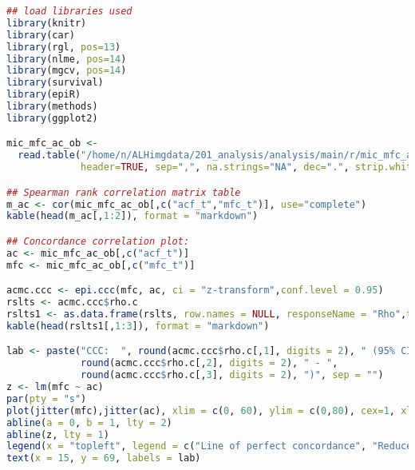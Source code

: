 \begin{lstlisting}[language=R, caption=Automatic and manual concordance correlation., label=cd:acmc-concord]
## load libraries used
library(knitr)
library(car)
library(rgl, pos=13)
library(nlme, pos=14)
library(mgcv, pos=14)
library(survival)
library(epiR)
library(methods)
library(ggplot2)

mic_mfc_ac_ob <- 
  read.table("/home/n/ALHimgdata/201_analysis/analysis/main/r/mic_mfc_ac_ob/csv/mic_mfc_ac_ob_4R.csv", 
             header=TRUE, sep=",", na.strings="NA", dec=".", strip.white=TRUE)

## Spearman rank correlation matrix table
m_ac <- cor(mic_mfc_ac_ob[,c("acf_t","mfc_t")], use="complete")
kable(head(m_ac[,1:2]), format = "markdown")

## Concordance correlation plot:
ac <- mic_mfc_ac_ob[,c("acf_t")]
mfc <- mic_mfc_ac_ob[,c("mfc_t")]

acmc.ccc <- epi.ccc(mfc, ac, ci = "z-transform",conf.level = 0.95)
rslts <- acmc.ccc$rho.c
rslts1 <- as.data.frame(rslts, row.names = NULL, responseName = "Rho",tringsAsFactors = TRUE)
kable(head(rslts1[,1:3]), format = "markdown")

lab <- paste("CCC:  ", round(acmc.ccc$rho.c[,1], digits = 2), " (95% CI ", 
             round(acmc.ccc$rho.c[,2], digits = 2), " - ",
             round(acmc.ccc$rho.c[,3], digits = 2), ")", sep = "")
z <- lm(mfc ~ ac)
par(pty = "s")
plot(jitter(mfc),jitter(ac), xlim = c(0, 60), ylim = c(0,80), cex=1, xlab = "Manual field counts", ylab = "Automatic counts", pch = 1)
abline(a = 0, b = 1, lty = 2)
abline(z, lty = 1)
legend(x = "topleft", legend = c("Line of perfect concordance", "Reduced major axis"), lty = c(2,1), lwd = c(1,1), bty = "n")
text(x = 15, y = 69, labels = lab)
\end{lstlisting}

